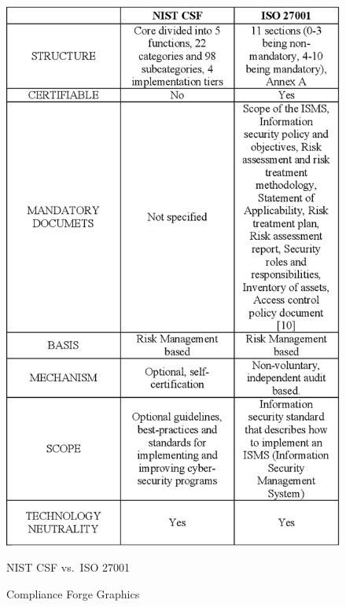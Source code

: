 \begin{figure}[t!]
\begin{minipage}[c]{0.4\linewidth}
             \includegraphics[scale=.45]{3-TableI-1.png}
             \caption{NIST CSF vs.\ ISO 27001}
       \end{minipage}
       \caption{Compliance Forge Graphics}
\end{figure}
\vspace*{\fill}



